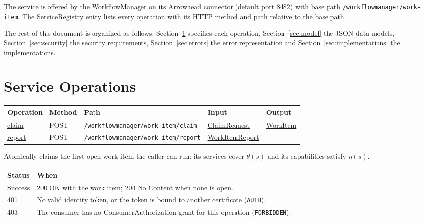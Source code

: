 \documentclass[a4paper]{arrowhead}
\newcommand{\mref}[1]{{\textcolor{ArrowheadPurple}{\hyperref[sec:model:#1]{#1}}}}
\newcommand{\oref}[1]{{\textcolor{ArrowheadBlue}{\hyperref[sec:operations:#1]{#1}}}}
\begin{document}
The service is offered by the WorkflowManager on its Arrowhead connector (default port 8482) with base path \texttt{/\allowbreak{}workflowmanager/\allowbreak{}work-\allowbreak{}item}.
The ServiceRegistry entry lists every operation with its HTTP method and path relative to the base path.

The rest of this document is organized as follows. Section~\ref{sec:operations} specifies each operation,
Section~\ref{sec:model} the JSON data models, Section~\ref{sec:security} the security requirements,
Section~\ref{sec:errors} the error representation and Section~\ref{sec:implementations} the implementations.

\newpage
\section{Service Operations}
\label{sec:operations}

{\small
\begin{longtable}{|p{3.0cm}|p{1.5cm}|p{5.3cm}|p{3.0cm}|p{3.0cm}|}

\hline
\rowcolor{gray!33} Operation & Method & Path & Input & Output \\ \hline
\endhead
\oref{claim} & POST & \texttt{/\allowbreak{}workflowmanager/\allowbreak{}work-\allowbreak{}item/\allowbreak{}claim} & \mref{ClaimRequest} & \mref{WorkItem} \\ \hline
\oref{report} & POST & \texttt{/\allowbreak{}workflowmanager/\allowbreak{}work-\allowbreak{}item/\allowbreak{}report} & \mref{WorkItemReport} & -- \\ \hline
\end{longtable}
}

Atomically claims the first open work item the caller can run: its services cover $\theta(s)$ and its capabilities satisfy $\eta(s)$.

{\small
\begin{longtable}{|p{2.0cm}|p{13.8cm}|}

\hline
\rowcolor{gray!33} Status & When \\ \hline
\endhead
Success & 200 OK with the work item; 204 No Content when none is open. \\ \hline
401 & No valid identity token, or the token is bound to another certificate (\texttt{AUTH}). \\ \hline
403 & The consumer has no ConsumerAuthorization grant for this operation (\texttt{FORBIDDEN}). \\ \hline
\end{longtable}
}
\end{document}
